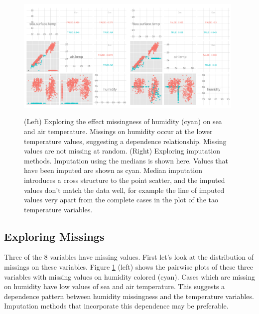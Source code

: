 \documentclass[english]{article}
\begin{document}
\begin{figure}[htp]
\centerline{\includegraphics[width=0.49\textwidth]{tao1_pairwise.png}\includegraphics[width=0.49\textwidth]{tao2_pairwise.png}}
\caption{(Left) Exploring the effect missingness of humidity (cyan) on sea and air temperature. Missings on humidity occur at the lower temperature values, suggesting a dependence relationship. Missing values are not missing at random. (Right) Exploring imputation methods. Imputation using the medians is shown here. Values that have been imputed are shown as cyan. Median imputation introduces a cross structure to the point scatter, and the imputed values don't match the data well, for example the line of imputed values very apart from the complete cases in the plot of the tao temperature variables.}
\label{tao1}
\end{figure}

\subsection{Exploring Missings}

Three of the 8 variables have missing values. First let's look at the distribution of missings on these variables. Figure \ref{tao1} (left) shows the pairwise plots of these three variables with missing values on humidity colored (cyan). Cases which are missing on humidity have  low values of sea and air temperature. This suggests a dependence pattern between humidity missingness and the temperature variables. Imputation methods that incorporate this dependence may be preferable.
\end{document}
